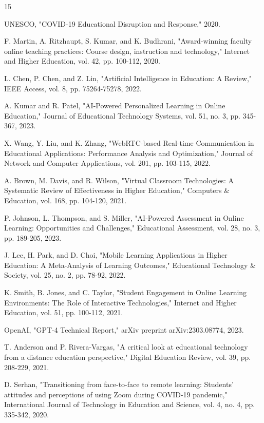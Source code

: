 \documentclass[onecolumn]{IEEEtran}
\begin{document}
\begin{thebibliography}{15}

 UNESCO, "COVID-19 Educational Disruption and Response," 2020.

 F. Martin, A. Ritzhaupt, S. Kumar, and K. Budhrani, "Award-winning faculty online teaching practices: Course design, instruction and technology," Internet and Higher Education, vol. 42, pp. 100-112, 2020.

 L. Chen, P. Chen, and Z. Lin, "Artificial Intelligence in Education: A Review," IEEE Access, vol. 8, pp. 75264-75278, 2022.

 A. Kumar and R. Patel, "AI-Powered Personalized Learning in Online Education," Journal of Educational Technology Systems, vol. 51, no. 3, pp. 345-367, 2023.

 X. Wang, Y. Liu, and K. Zhang, "WebRTC-based Real-time Communication in Educational Applications: Performance Analysis and Optimization," Journal of Network and Computer Applications, vol. 201, pp. 103-115, 2022.

 A. Brown, M. Davis, and R. Wilson, "Virtual Classroom Technologies: A Systematic Review of Effectiveness in Higher Education," Computers \& Education, vol. 168, pp. 104-120, 2021.

 P. Johnson, L. Thompson, and S. Miller, "AI-Powered Assessment in Online Learning: Opportunities and Challenges," Educational Assessment, vol. 28, no. 3, pp. 189-205, 2023.

 J. Lee, H. Park, and D. Choi, "Mobile Learning Applications in Higher Education: A Meta-Analysis of Learning Outcomes," Educational Technology \& Society, vol. 25, no. 2, pp. 78-92, 2022.

 K. Smith, B. Jones, and C. Taylor, "Student Engagement in Online Learning Environments: The Role of Interactive Technologies," Internet and Higher Education, vol. 51, pp. 100-112, 2021.

 OpenAI, "GPT-4 Technical Report," arXiv preprint arXiv:2303.08774, 2023.

 T. Anderson and P. Rivera-Vargas, "A critical look at educational technology from a distance education perspective," Digital Education Review, vol. 39, pp. 208-229, 2021.

 D. Serhan, "Transitioning from face-to-face to remote learning: Students' attitudes and perceptions of using Zoom during COVID-19 pandemic," International Journal of Technology in Education and Science, vol. 4, no. 4, pp. 335-342, 2020.


\end{thebibliography}
\end{document}
